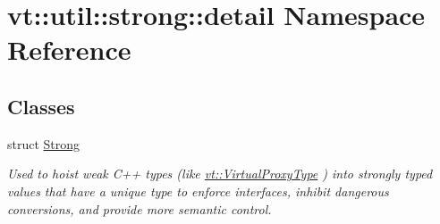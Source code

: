 \hypertarget{namespacevt_1_1util_1_1strong_1_1detail}{}\section{vt\+:\+:util\+:\+:strong\+:\+:detail Namespace Reference}
\label{namespacevt_1_1util_1_1strong_1_1detail}
\subsection*{Classes}
\begin{DoxyCompactItemize}
\item 
struct \hyperlink{structvt_1_1util_1_1strong_1_1detail_1_1_strong}{Strong}
\begin{DoxyCompactList}\small\item\em Used to hoist weak C++ types (like {\ttfamily \hyperlink{namespacevt_a1b417dd5d684f045bb58a0ede70045ac}{vt\+::\+Virtual\+Proxy\+Type}} ) into strongly typed values that have a unique type to enforce interfaces, inhibit dangerous conversions, and provide more semantic control. \end{DoxyCompactList}\end{DoxyCompactItemize}
